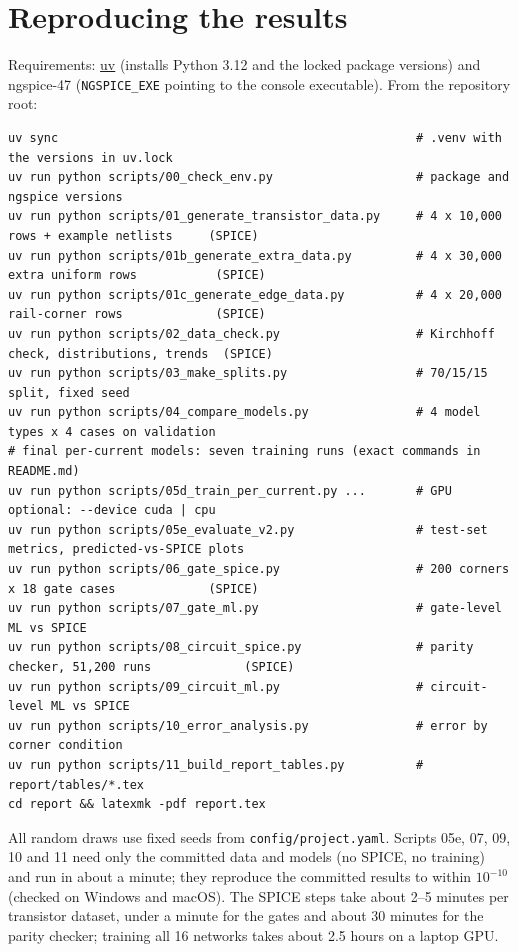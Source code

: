 \section{Reproducing the results}\label{app:reproduce}
Requirements: \href{https://docs.astral.sh/uv/}{uv} (installs Python 3.12 and the locked package versions) and ngspice-47 (\texttt{NGSPICE\_EXE}
pointing to the console executable). From the repository root:
{\scriptsize
\begin{verbatim}
uv sync                                                  # .venv with the versions in uv.lock
uv run python scripts/00_check_env.py                    # package and ngspice versions
uv run python scripts/01_generate_transistor_data.py     # 4 x 10,000 rows + example netlists     (SPICE)
uv run python scripts/01b_generate_extra_data.py         # 4 x 30,000 extra uniform rows           (SPICE)
uv run python scripts/01c_generate_edge_data.py          # 4 x 20,000 rail-corner rows             (SPICE)
uv run python scripts/02_data_check.py                   # Kirchhoff check, distributions, trends  (SPICE)
uv run python scripts/03_make_splits.py                  # 70/15/15 split, fixed seed
uv run python scripts/04_compare_models.py               # 4 model types x 4 cases on validation
# final per-current models: seven training runs (exact commands in README.md)
uv run python scripts/05d_train_per_current.py ...       # GPU optional: --device cuda | cpu
uv run python scripts/05e_evaluate_v2.py                 # test-set metrics, predicted-vs-SPICE plots
uv run python scripts/06_gate_spice.py                   # 200 corners x 18 gate cases             (SPICE)
uv run python scripts/07_gate_ml.py                      # gate-level ML vs SPICE
uv run python scripts/08_circuit_spice.py                # parity checker, 51,200 runs             (SPICE)
uv run python scripts/09_circuit_ml.py                   # circuit-level ML vs SPICE
uv run python scripts/10_error_analysis.py               # error by corner condition
uv run python scripts/11_build_report_tables.py          # report/tables/*.tex
cd report && latexmk -pdf report.tex
\end{verbatim}}
All random draws use fixed seeds from \texttt{config/project.yaml}. Scripts 05e, 07, 09, 10 and 11 need only the committed data and models
(no SPICE, no training) and run in about a minute; they reproduce the committed results to within $10^{-10}$ (checked on Windows and macOS).
The SPICE steps take about 2--5 minutes per transistor dataset, under a minute for the gates and about 30 minutes for the parity checker; training all
16 networks takes about 2.5 hours on a laptop GPU.
